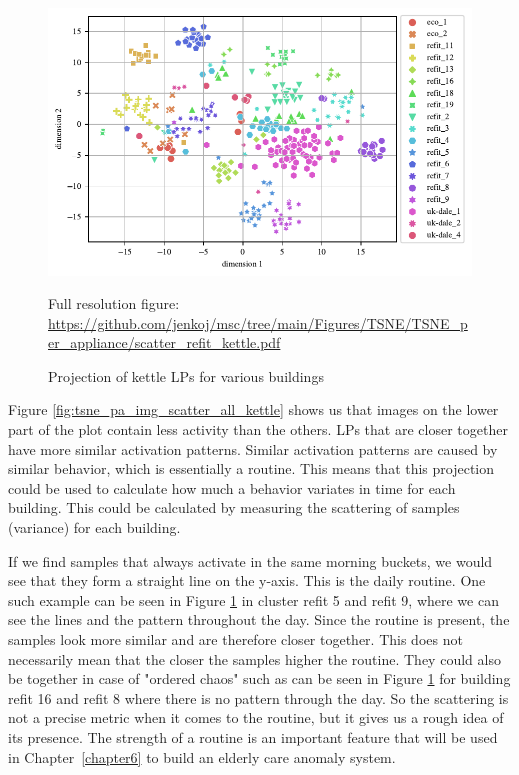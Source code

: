 \begin{figure}[H]
	\centering
	\caption{Projection of kettle LPs for various buildings}
	\includegraphics[]{Figures/TSNE/TSNE_per_appliance/scatter_refit_kettle.pdf}
	\label{fig:tsne_pa_scatter_all_kettle}
	\par
	\par\footnotesize{Full resolution figure: \url{https://github.com/jenkoj/msc/tree/main/Figures/TSNE/TSNE_per_appliance/scatter_refit_kettle.pdf}}
\end{figure}

Figure \ref{fig:tsne_pa_img_scatter_all_kettle} shows us that images on the lower part 
of the plot contain less activity than the others. 
LPs that are closer together have more similar activation patterns.
Similar activation patterns are caused by similar behavior, which is essentially a routine.
This means that this projection could be used to calculate how much a behavior variates in time for each building.
This could be calculated by measuring the scattering of samples (variance) for each building.

If we find samples that always activate in the same morning buckets, we would see that they form a straight line on the y-axis.
This is the daily routine. One such example can be seen in Figure \ref{fig:tsne_pa_scatter_all_kettle} in cluster refit 5 and refit 9, where we can see the lines and the pattern throughout the day. 
Since the routine is present, the samples look more similar and are therefore closer together. 
This does not necessarily mean that the closer the samples higher the routine.
They could also be together in case of "ordered chaos" such as can be seen in Figure \ref{fig:tsne_pa_scatter_all_kettle} for building refit 16 and refit 8 where there is no pattern through the day.
So the scattering is not a precise metric when it comes to the routine, but it gives us a rough idea of its presence.
The strength of a routine is an important feature that will be used
in Chapter \ref{chapter6} to build an elderly care anomaly system.

